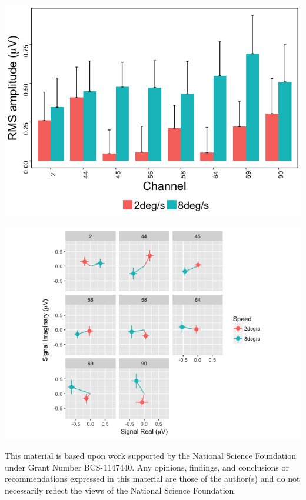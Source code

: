 \documentclass[landscape,final,paperwidth=48in,paperheight=33in,fontscale=0.285]{baposter}
\begin{document}
\begin{poster}
{\begin{center}
  \includegraphics[scale=0.3,valign=t]{figX-vector-amplitude-barplots-speed-1-2F1.png}

 \includegraphics[scale=0.3,valign=t]{figX-complex-domain-speed-1-2F1.png}
 \end{center}
}

    {
   \smaller
   
      This material is based upon work supported by the National Science Foundation under Grant Number BCS-1147440.
      Any opinions, findings, and conclusions or recommendations expressed in this material are those of the author(s) and do not necessarily reflect the views of the National Science Foundation.
    }
    {
    \smaller
    
}
\end{poster}
\end{document}
